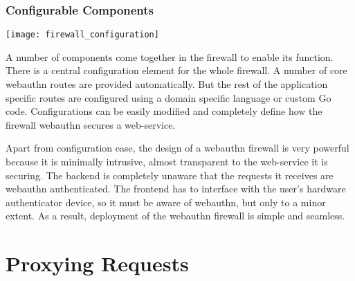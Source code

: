 \subsubsection{Configurable Components}

\begin{center}
\texttt{[image: firewall\_configuration]}
\end{center}

A number of components come together in the firewall to enable its function. There is a central configuration element for the whole firewall. A number of core webauthn routes are provided automatically. But the rest of the application specific routes are configured using a domain specific language or custom Go code. Configurations can be easily modified and completely define how the firewall webauthn secures a web-service.

Apart from configuration ease, the design of a webauthn firewall is very powerful because it is minimally intrusive, almost transparent to the web-service it is securing. The backend is completely unaware that the requests it receives are webauthn authenticated. The frontend has to interface with the user's hardware authenticator device, so it must be aware of webauthn, but only to a minor extent. As a result, deployment of the webauthn firewall is simple and seamless.




\section{Proxying Requests}\label{Sec:ProxyingRequests}

